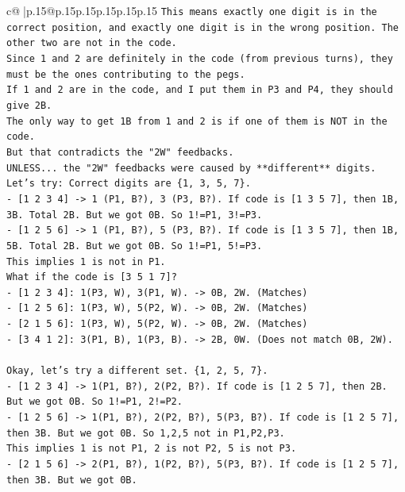 \documentclass{article}
\begin{document}
{\begin{supertabular}{c@{$\;$}|p{.15\linewidth}@{}p{.15\linewidth}p{.15\linewidth}p{.15\linewidth}p{.15\linewidth}p{.15\linewidth}}
{{{\texttt{This means exactly one digit is in the correct position, and exactly one digit is in the wrong position. The other two are not in the code.} \\
\texttt{Since 1 and 2 are definitely in the code (from previous turns), they must be the ones contributing to the pegs.} \\
\texttt{If 1 and 2 are in the code, and I put them in P3 and P4, they should give 2B.} \\
\texttt{The only way to get 1B from 1 and 2 is if one of them is NOT in the code.} \\
\texttt{But that contradicts the "2W" feedbacks.} \\
\texttt{UNLESS... the "2W" feedbacks were caused by **different** digits.} \\
\texttt{Let's try: Correct digits are \{1, 3, 5, 7\}.} \\
\texttt{{-} {[}1 2 3 4{]} {-}> 1 (P1, B?), 3 (P3, B?). If code is {[}1 3 5 7{]}, then 1B, 3B. Total 2B. But we got 0B. So 1!=P1, 3!=P3.} \\
\texttt{{-} {[}1 2 5 6{]} {-}> 1 (P1, B?), 5 (P3, B?). If code is {[}1 3 5 7{]}, then 1B, 5B. Total 2B. But we got 0B. So 1!=P1, 5!=P3.} \\
\texttt{This implies 1 is not in P1.} \\
\texttt{What if the code is {[}3 5 1 7{]}?} \\
\texttt{{-} {[}1 2 3 4{]}: 1(P3, W), 3(P1, W). {-}> 0B, 2W. (Matches)} \\
\texttt{{-} {[}1 2 5 6{]}: 1(P3, W), 5(P2, W). {-}> 0B, 2W. (Matches)} \\
\texttt{{-} {[}2 1 5 6{]}: 1(P3, W), 5(P2, W). {-}> 0B, 2W. (Matches)} \\
\texttt{{-} {[}3 4 1 2{]}: 3(P1, B), 1(P3, B). {-}> 2B, 0W. (Does not match 0B, 2W).} \\
\\ 
\texttt{Okay, let's try a different set. \{1, 2, 5, 7\}.} \\
\texttt{{-} {[}1 2 3 4{]} {-}> 1(P1, B?), 2(P2, B?). If code is {[}1 2 5 7{]}, then 2B. But we got 0B. So 1!=P1, 2!=P2.} \\
\texttt{{-} {[}1 2 5 6{]} {-}> 1(P1, B?), 2(P2, B?), 5(P3, B?). If code is {[}1 2 5 7{]}, then 3B. But we got 0B. So 1,2,5 not in P1,P2,P3.} \\
\texttt{This implies 1 is not P1, 2 is not P2, 5 is not P3.} \\
\texttt{{-} {[}2 1 5 6{]} {-}> 2(P1, B?), 1(P2, B?), 5(P3, B?). If code is {[}1 2 5 7{]}, then 3B. But we got 0B.} \\
}}}
\end{supertabular}}
\end{document}
